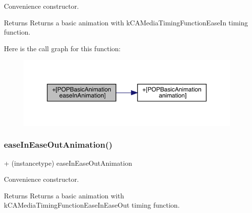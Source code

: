 Convenience constructor. \begin{DoxyReturn}{Returns}
Returns a basic animation with k\+C\+A\+Media\+Timing\+Function\+Ease\+In timing function. 
\end{DoxyReturn}
Here is the call graph for this function\+:\nopagebreak
\begin{figure}[H]
\begin{center}
\leavevmode
\includegraphics[width=345pt]{interface_p_o_p_basic_animation_a19baa1e60760e093db39511258f2a4fe_cgraph}
\end{center}
\end{figure}
\mbox{\label{interface_p_o_p_basic_animation_a13f8eb84a553d3c366fac03fd5b71adb}} 
\subsubsection{\texorpdfstring{ease\+In\+Ease\+Out\+Animation()}{easeInEaseOutAnimation()}\hspace{0.1cm}{\footnotesize\ttfamily [1/3]}}
{\footnotesize\ttfamily + (instancetype) ease\+In\+Ease\+Out\+Animation \begin{DoxyParamCaption}{ }\end{DoxyParamCaption}}

Convenience constructor. \begin{DoxyReturn}{Returns}
Returns a basic animation with k\+C\+A\+Media\+Timing\+Function\+Ease\+In\+Ease\+Out timing function. 
\end{DoxyReturn}
\mbox{\label{interface_p_o_p_basic_animation_a13f8eb84a553d3c366fac03fd5b71adb}} 
